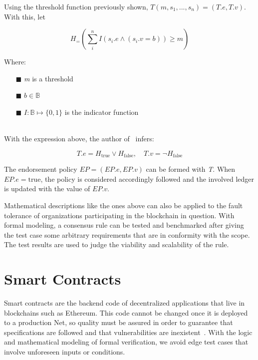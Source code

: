 \documentclass[sigconf, nonacm]{acmart}
\begin{document}
Using the threshold function previously shown, $T(m,s_1,... ,s_n) = (T.e,T.v)$. With this, let

\begin{displaymath}
  H_ = \left(\sum_{i}^{n} I(s_i.e \wedge (s_i.v = b)) \geq m \right)
\end{displaymath}

Where:

\begin{enumerate}
  \item[$\blacksquare$] \textit{m} is a threshold
  \item[$\blacksquare$] $b \in \mathbb{B}$
  \item[$\blacksquare$] $I : \mathbb{B} \mapsto \{0,1\}$  is the indicator function
\end{enumerate}
\  \\ %

With the expression above, the author of~\cite{Kawahara2020} infers:

\begin{displaymath}
  T.e = H_{\textrm{true}} \vee H_{\textrm{false}}, \quad T.v = \neg{H_{\textrm{false}}}
\end{displaymath}
\linebreak[1]

The  endorsement policy $EP = (EP.e,EP.v)$ can be formed with \textit{T}. When $EP.e = \textrm{true}$, the policy
is considered accordingly followed and the involved ledger is updated with the value of $EP.v$.

Mathematical descriptions like the ones above can also be applied to the fault tolerance of organizations participating in the blockchain in question.
With formal modeling, a consensus rule can be tested and benchmarked after giving the test case some arbitrary requirements that are in conformity with the scope.
The test results are used to judge the viability and scalability of the rule. 

\section{Smart Contracts}\label{smartContracts}
Smart contracts are the backend code of decentralized applications that live in blockchains such as Ethereum. 
This code cannot be changed once it is deployed to a production Net, so quality must be assured in order to guarantee
that specifications are followed and that vulnerabilities are inexistent~\cite{Murray2019}.
With the logic and mathematical modeling of formal verification, we avoid edge test cases that involve unforeseen inputs or conditions.
\end{document}
